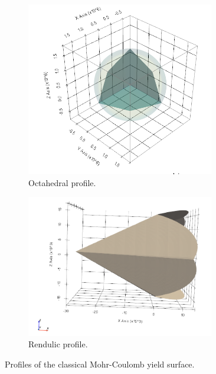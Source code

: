 \begin{figure}[htbp!]
  \begin{subfigure}[t]{0.5\textwidth}
    \centering
    \includegraphics[width=0.9\textwidth]{Figs/mohr_coulomb/MC_octahedral_profile.png}
    \caption{Octahedral profile.}
  \end{subfigure}
  \begin{subfigure}[t]{0.5\textwidth}
    \centering
    \includegraphics[width=0.9\textwidth]{Figs/mohr_coulomb/MC_rendulic.png}
    \caption{Rendulic profile.}
  \end{subfigure}
  \caption{Profiles of the classical Mohr-Coulomb yield surface.}
  \label{fig:MC}
\end{figure}

